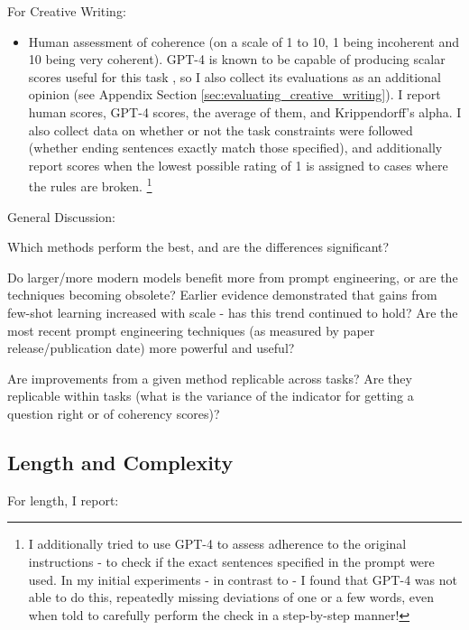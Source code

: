 \documentclass[11pt]{article}
\begin{document}
For Creative Writing:
\begin{itemize}
  \item Human assessment of coherence (on a scale of 1 to 10, 1 being incoherent and 10 being very coherent). GPT-4 is known to be capable of producing scalar scores useful for this task \cite{yao_tree_2023}, so I also collect its evaluations as an additional opinion (see Appendix Section \ref{sec:evaluating_creative_writing}). I report human scores, GPT-4 scores, the average of them, and Krippendorff's alpha. I also collect data on whether or not the task constraints were followed (whether ending sentences exactly match those specified), and additionally report scores when the lowest possible rating of 1 is assigned to cases where the rules are broken. \footnote{I additionally tried to use GPT-4 to assess adherence to the original instructions - to check if the exact sentences specified in the prompt were used. In my initial experiments - in contrast to \citealp{yao_tree_2023} - I found that GPT-4 was not able to do this, repeatedly missing deviations of one or a few words, even when told to carefully perform the check in a step-by-step manner!}
\end{itemize}

%

General Discussion:

Which methods perform the best, and are the differences significant?

Do larger/more modern models benefit more from prompt engineering, or are the techniques becoming obsolete? Earlier evidence demonstrated that gains from few-shot learning increased with scale - has this trend continued to hold? \cite{brown_language_2020} Are the most recent prompt engineering techniques (as measured by paper release/publication date) more powerful and useful?

Are improvements from a given method replicable across tasks? Are they replicable within tasks (what is the variance of the indicator for getting a question right or of coherency scores)?

\subsection*{Length and Complexity}

For length, I report:
\end{document}
